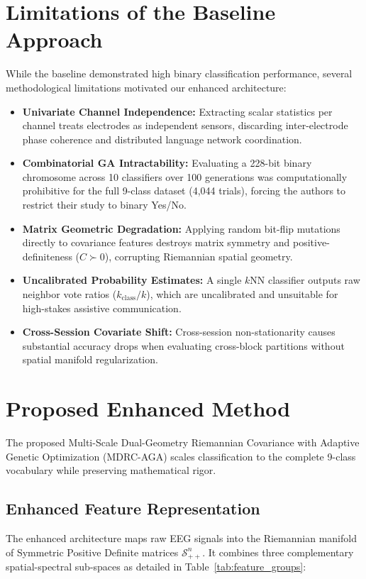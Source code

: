 \documentclass[10pt,twocolumn,a4paper]{article}
\begin{document}
\section{Limitations of the Baseline Approach}
While the baseline demonstrated high binary classification performance, several methodological limitations motivated our enhanced architecture:
\begin{itemize}
    \item \textbf{Univariate Channel Independence:} Extracting scalar statistics per channel treats electrodes as independent sensors, discarding inter-electrode phase coherence and distributed language network coordination.
    \item \textbf{Combinatorial GA Intractability:} Evaluating a 228-bit binary chromosome across 10 classifiers over 100 generations was computationally prohibitive for the full 9-class dataset (4,044 trials), forcing the authors to restrict their study to binary Yes/No.
    \item \textbf{Matrix Geometric Degradation:} Applying random bit-flip mutations directly to covariance features destroys matrix symmetry and positive-definiteness ($C \succ 0$), corrupting Riemannian spatial geometry.
    \item \textbf{Uncalibrated Probability Estimates:} A single $k$NN classifier outputs raw neighbor vote ratios ($k_{\text{class}}/k$), which are uncalibrated and unsuitable for high-stakes assistive communication.
    \item \textbf{Cross-Session Covariate Shift:} Cross-session non-stationarity causes substantial accuracy drops when evaluating cross-block partitions without spatial manifold regularization.
\end{itemize}

\section{Proposed Enhanced Method}
The proposed Multi-Scale Dual-Geometry Riemannian Covariance with Adaptive Genetic Optimization (MDRC-AGA) scales classification to the complete 9-class vocabulary while preserving mathematical rigor.

\subsection{Enhanced Feature Representation}
The enhanced architecture maps raw EEG signals into the Riemannian manifold of Symmetric Positive Definite matrices $\mathcal{S}_{++}^n$. It combines three complementary spatial-spectral sub-spaces as detailed in Table~\ref{tab:feature_groups}:
\end{document}
